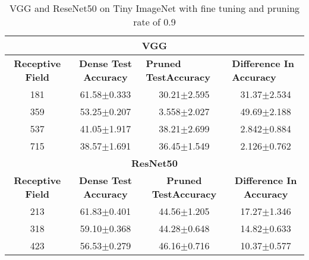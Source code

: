 \begin{table}[H]
\begin{tabular}{@{}cccc@{}}
\toprule
\multicolumn{4}{c}{\textbf{VGG}}                                                                                                                                  \\ \midrule
\textbf{Receptive Field} & \textbf{Dense Test Accuracy} & \multicolumn{1}{l}{\textbf{Pruned  TestAccuracy}} & \multicolumn{1}{l}{\textbf{Difference In Accuracy}} \\ \midrule
181                      & 61.58$\pm$0.333              & 30.21$\pm$2.595                                   & 31.37$\pm$2.534                                     \\
359                      & 53.25$\pm$0.207              & 3.558$\pm$2.027                                   & 49.69$\pm$2.188                                     \\
537                      & 41.05$\pm$1.917              & 38.21$\pm$2.699                                   & 2.842$\pm$0.884                                     \\
715                      & 38.57$\pm$1.691              & 36.45$\pm$1.549                                   & 2.126$\pm$0.762                                     \\ \midrule
\multicolumn{4}{c}{\textbf{ResNet50}}                                                                                                                             \\ \midrule
\textbf{Receptive Field} & \textbf{Dense Test Accuracy} & \textbf{Pruned  TestAccuracy}                     & \textbf{Difference In Accuracy}                     \\
213                      & 61.83$\pm$0.401              & 44.56$\pm$1.205                                   & 17.27$\pm$1.346                                     \\
318                      & 59.10$\pm$0.368              & 44.28$\pm$0.648                                   & 14.82$\pm$0.633                                     \\
423                      & 56.53$\pm$0.279              & 46.16$\pm$0.716                                   & 10.37$\pm$0.577                                     \\ \bottomrule
\end{tabular}
\caption{VGG and ReseNet50 on Tiny ImageNet with fine tuning  and pruning rate of 0.9}
\label{tab:cifar10 fine tuning pruning rate 09}
\end{table}

